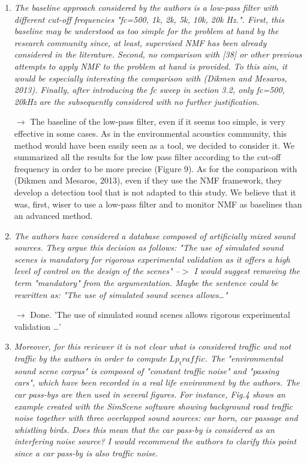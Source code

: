 \documentclass[10pt]{article}
\begin{document}
\begin{enumerate}
\item \emph{The baseline approach considered by the authors is a low-pass filter with different cut-off frequencies "fc={500, 1k, 2k, 5k, 10k, 20k} Hz.". First, this baseline may be understood as too simple for the problem at hand by the research community since, at least, supervised NMF has been already considered in the literature. Second, no comparison with [38] or other previous attempts to apply NMF to the problem at hand is provided. To this aim, it would be especially interesting the comparison with (Dikmen and Mesaros, 2013). Finally, after introducing the fc sweep in section 3.2, only fc={500, 20k}Hz are the subsequently considered with no further justification.}

$\rightarrow$ The baseline of the low-pass filter, even if it seems too simple, is very effective in some cases. As in the environmental acoustics community, this method would have been easily seen as a tool, we decided to consider it. We summarized all the results for the low pass filter according to the cut-off frequency in order to be more precise (Figure 9).
As for the comparison with (Dikmen and Mesaros, 2013), even if they use the NMF framework, they develop a detection tool that is not adapted to this study. We believe that it was, first, wiser to use a low-pass filter and to monitor NMF as baselines than an advanced method.

\item \emph{The authors have considered a database composed of artificially mixed sound sources. They argue this decision as follows: "The use of simulated sound scenes is mandatory for rigorous experimental validation as it offers a high level of control on the design of the scenes" --$>$ I would suggest removing the term "mandatory" from the argumentation. Maybe the sentence could be rewritten as: "The use of simulated sound scenes allows…" }

$\rightarrow$ Done. 'The use of simulated sound scenes allows rigorous experimental validation \dots'


\item \emph{Moreover, for this reviewer it is not clear what is considered traffic and not traffic by the authors in order to compute $Lp_traffic$. The "environmental sound scene corpus" is composed of "constant traffic noise" and "passing cars", which have been recorded in a real life environment by the authors. The car pass-bys are then used in several figures. For instance, Fig.4 shows an example created with the SimScene software showing background road traffic noise together with three overlapped sound sources: car horn, car passage and whistling birds. Does this mean that the car pass-by is considered as an interfering noise source? I would recommend the authors to clarify this point since a car pass-by is also traffic noise.}


\end{enumerate}
\end{document}
